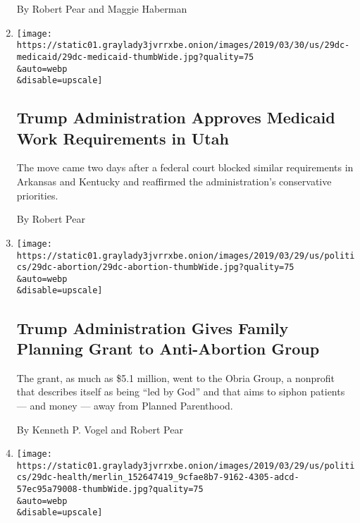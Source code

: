 \begin{enumerate}
  By Robert Pear and Maggie Haberman
\item
  \href{/2019/03/29/us/politics/medicaid-trump-utah.html}{}

  \texttt{[image: https://static01.graylady3jvrrxbe.onion/images/2019/03/30/us/29dc-medicaid/29dc-medicaid-thumbWide.jpg?quality=75\\\&auto=webp\\\&disable=upscale]}

  \hypertarget{trump-administration-approves-medicaid-work-requirements-in-utah}{%
  \subsection{Trump Administration Approves Medicaid Work Requirements
  in
  Utah}\label{trump-administration-approves-medicaid-work-requirements-in-utah}}

  The move came two days after a federal court blocked similar
  requirements in Arkansas and Kentucky and reaffirmed the
  administration's conservative priorities.

  By Robert Pear
\item
  \href{/2019/03/29/us/politics/trump-grant-abortion.html}{}

  \texttt{[image: https://static01.graylady3jvrrxbe.onion/images/2019/03/29/us/politics/29dc-abortion/29dc-abortion-thumbWide.jpg?quality=75\\\&auto=webp\\\&disable=upscale]}

  \hypertarget{trump-administration-gives-family-planning-grant-to-anti-abortion-group}{%
  \subsection{Trump Administration Gives Family Planning Grant to
  Anti-Abortion
  Group}\label{trump-administration-gives-family-planning-grant-to-anti-abortion-group}}

  The grant, as much as \$5.1 million, went to the Obria Group, a
  nonprofit that describes itself as being ``led by God'' and that aims
  to siphon patients --- and money --- away from Planned Parenthood.

  By Kenneth P. Vogel and Robert Pear
\item
  \href{/2019/03/28/us/politics/trump-judge-health-care.html}{}

  \texttt{[image: https://static01.graylady3jvrrxbe.onion/images/2019/03/29/us/politics/29dc-health/merlin\_152647419\_9cfae8b7-9162-4305-adcd-57ec95a79008-thumbWide.jpg?quality=75\\\&auto=webp\\\&disable=upscale]}

  \hypertarget{in-blow-to-trump-judge-blocks-health-care-law-end-run}{%
}
\end{enumerate}
